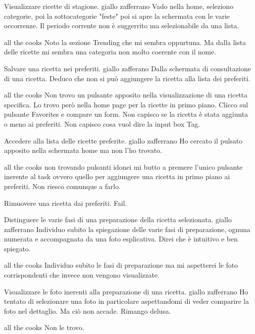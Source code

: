 \item Visualizzare ricette di stagione.
giallo zafferrano
Vado nella home, seleziono categorie, poi la sottocategorie "feste" poi
si apre la schermata con le varie occorrenze. Il periodo corrente non è
suggerrito ma selezionabile da una lista.

all the cooks
Noto la sezione Trending che mi sembra oppurtuna. Ma dalla lista delle
ricette mi sembra una categoria non molto coerente con il nome.

\item Salvare una ricetta nei preferiti.
giallo zafferano
Dalla schermata di consultazione di una ricetta. Deduco che non si
può aggiungere la ricetta alla lista dei preferiti.

all the cooks
Non trovo un pulsante apposito nella visualizzazione di una ricetta
specifica. Lo trovo però nella home page per la ricette in primo piano.
Clicco sul pulsante Favorites e compare un form. Non capisco se la
ricetta è stata aggiunta o meno ai preferiti. Non capisco cosa vuol dire
la input box Tag.

\item Accedere alla lista delle ricette preferite.
giallo zafferrano
Ho cercato il pulsato apposito nella schermata home ma non l'ho trovato.

all the cooks
non trovando pulsanti idonei mi butto a premere l'unico pulsante
inerente al task ovvero quello per aggiungere una ricetta in primo piano
ai preferiti. Non riesco comunque a farlo.

\item Rimuovere una ricetta dai preferiti.
Fail.

\item Distinguere le varie fasi di una preparazione della ricetta
selezionata.
giallo zafferrano
Individuo subito la spiegazione delle varie fasi di preparazione, ognuna
numerata e accompagnata da una foto esplicativa. Direi che è intuitivo e
ben spiegato.

all the cooks
Individuo subito le fasi di preparazione ma mi aspetterei le foto
corrispondenti che invece non vengono visualizzate.

\item Visualizzare le foto inerenti alla preparazione di
una ricetta.
giallo zafferrano
Ho tentato di selezionare una foto in particolare aspettandomi di veder
comparire la foto nel dettaglio. Ma ciò non accade. Rimango delusa.

all the cooks
Non le trovo.

